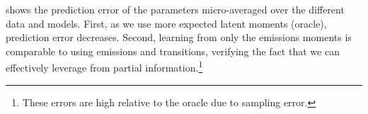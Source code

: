 

shows the prediction error of the parameters
micro-averaged over the different data and models.  First, as we use
more expected latent moments (oracle), prediction error decreases.  Second,
learning from only the emissions moments is comparable
to using emissions and transitions, verifying the fact that
we can effectively leverage from partial information.\footnote{
These errors are high relative to the oracle due to sampling error.}



